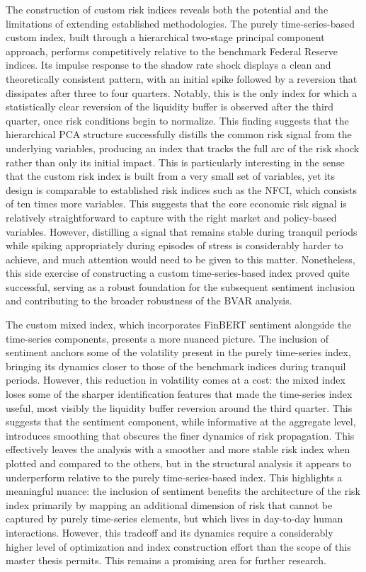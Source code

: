 \documentclass[12pt,a4paper]{report}\usepackage[a4paper, top=2.5cm, bottom=2.5cm, left=2.5cm, right=2.5cm]{geometry}
\begin{document}
The construction of custom risk indices reveals both the potential and the limitations
of extending established methodologies. The purely time-series-based custom index,
built through a hierarchical two-stage principal component approach, performs
competitively relative to the benchmark Federal Reserve indices. Its impulse response
to the shadow rate shock displays a clean and theoretically consistent pattern, with
an initial spike followed by a reversion that dissipates after three to four quarters.
Notably, this is the only index for which a statistically clear reversion of the
liquidity buffer is observed after the third quarter, once risk conditions begin to
normalize. This finding suggests that the hierarchical PCA structure successfully
distills the common risk signal from the underlying variables, producing an index
that tracks the full arc of the risk shock rather than only its initial impact. This is particularly interesting in the sense that the custom risk index is built from a very small set of variables, yet its design is comparable to established risk indices such as the NFCI, which consists of ten times more variables. This suggests that the core economic risk signal is relatively straightforward to capture with the right market and policy-based variables. However, distilling a signal that remains stable during tranquil periods while spiking appropriately during episodes of stress is considerably harder to achieve, and much attention would need to be given to this matter. Nonetheless, this side exercise of constructing a custom time-series-based index proved quite successful, serving as a robust foundation for the subsequent sentiment inclusion and contributing to the broader robustness of the BVAR analysis. 

The custom mixed index, which incorporates FinBERT sentiment alongside the
time-series components, presents a more nuanced picture. The inclusion of sentiment
anchors some of the volatility present in the purely time-series index, bringing
its dynamics closer to those of the benchmark indices during tranquil periods.
However, this reduction in volatility comes at a cost: the mixed index loses some
of the sharper identification features that made the time-series index useful, most
visibly the liquidity buffer reversion around the third quarter. This suggests that
the sentiment component, while informative at the aggregate level, introduces
smoothing that obscures the finer dynamics of risk propagation. This effectively leaves the analysis with a smoother and more stable risk index when plotted and compared to the others, but in the structural analysis it appears to underperform relative to the purely time-series-based index. This highlights a meaningful nuance: the inclusion of sentiment benefits the architecture of the risk index primarily by mapping an additional dimension of risk that cannot be captured by purely time-series elements, but which lives in day-to-day human interactions. However, this tradeoff and its dynamics require a considerably higher level of optimization and index construction effort than the scope of this master thesis permits. This remains a promising area for further research. 
\end{document}
